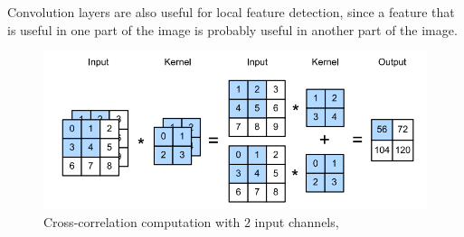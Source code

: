 \documentclass{beamer}
\begin{document}
\begin{frame}[allowframebreaks]
Convolution layers are also useful for local feature detection, since a feature that is useful in one part of the image is probably useful in another part of the image.
\begin{figure}[H]
\centering
\includegraphics[scale=0.5]{png/cross_corr_2_dim.png}
\caption{Cross-correlation computation with $2$ input channels, {\cite{zhang2020dive}}}
\label{fig:2-dim}
\end{figure} 
\end{frame}
\end{document}
